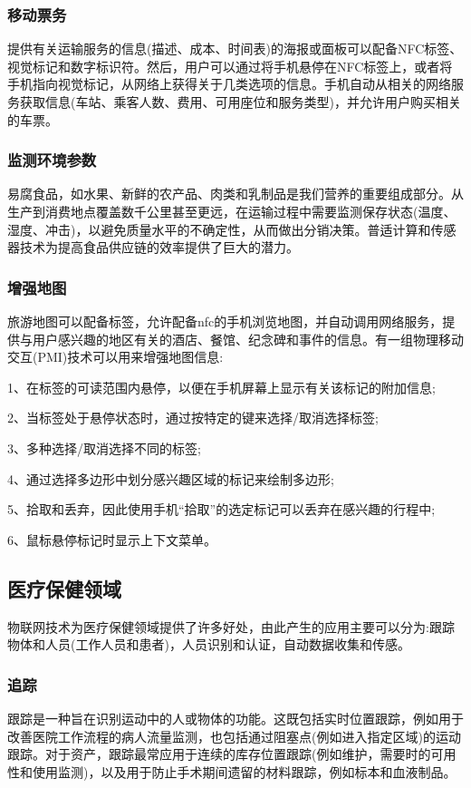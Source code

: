 \documentclass[12pt,a4paper]{article}%
\begin{document}
\subsubsection{移动票务}
提供有关运输服务的信息(描述、成本、时间表)的海报或面板可以配备NFC标签、视觉标记和数字标识符。然后，用户可以通过将手机悬停在NFC标签上，或者将手机指向视觉标记，从网络上获得关于几类选项的信息。手机自动从相关的网络服务获取信息(车站、乘客人数、费用、可用座位和服务类型)，并允许用户购买相关的车票。
\subsubsection{监测环境参数}
易腐食品，如水果、新鲜的农产品、肉类和乳制品是我们营养的重要组成部分。从生产到消费地点覆盖数千公里甚至更远，在运输过程中需要监测保存状态(温度、湿度、冲击)，以避免质量水平的不确定性，从而做出分销决策。普适计算和传感器技术为提高食品供应链的效率提供了巨大的潜力。
\subsubsection{增强地图}
旅游地图可以配备标签，允许配备nfc的手机浏览地图，并自动调用网络服务，提供与用户感兴趣的地区有关的酒店、餐馆、纪念碑和事件的信息。有一组物理移动交互(PMI)技术可以用来增强地图信息:

1、在标签的可读范围内悬停，以便在手机屏幕上显示有关该标记的附加信息;

2、当标签处于悬停状态时，通过按特定的键来选择/取消选择标签;

3、多种选择/取消选择不同的标签;

4、通过选择多边形中划分感兴趣区域的标记来绘制多边形;

5、拾取和丢弃，因此使用手机“拾取”的选定标记可以丢弃在感兴趣的行程中;

6、鼠标悬停标记时显示上下文菜单。

\subsection{医疗保健领域}
物联网技术为医疗保健领域提供了许多好处，由此产生的应用主要可以分为:跟踪物体和人员(工作人员和患者)，人员识别和认证，自动数据收集和传感。
\subsubsection{追踪}
跟踪是一种旨在识别运动中的人或物体的功能。这既包括实时位置跟踪，例如用于改善医院工作流程的病人流量监测，也包括通过阻塞点(例如进入指定区域)的运动跟踪。对于资产，跟踪最常应用于连续的库存位置跟踪(例如维护，需要时的可用性和使用监测)，以及用于防止手术期间遗留的材料跟踪，例如标本和血液制品。
\end{document}
